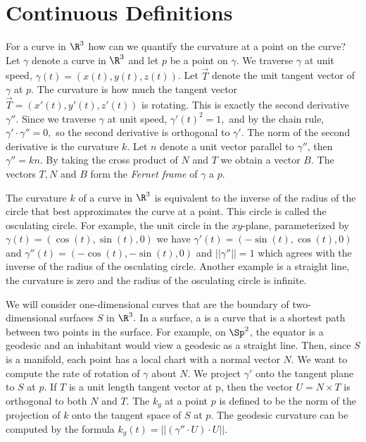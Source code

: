 \section{Continuous Definitions}



For a curve in $\R^3$ how can we quantify the curvature at a point on the curve?
Let $\gamma$ denote a curve in $\R^3$ and let $p$ be a point on $\gamma$.
We traverse $\gamma$ at unit speed, $\gamma(t)=(x(t),y(t),z(t))$.  
Let $\vec{T}$ denote the unit tangent vector of $\gamma$ at $p$. 
The curvature is how much the tangent vector $\vec{T}=(x'(t),y'(t),z'(t))$ is rotating. 
This is exactly the second derivative $\gamma''$. Since we traverse $\gamma$
at unit speed, $\gamma'(t)^2=1,$ and by the chain rule, $\gamma'\cdot \gamma''=0,$
so  the second derivative is orthogonal to $\gamma'$. The norm of the second
derivative is the curvature $k$.
Let $n$ denote a unit vector parallel to $\gamma''$, then $\gamma''=k n$.
By taking the cross product of $N$ and $T$ we obtain a vector $B$.
The vectors $T,N$ and $B$ form the \emph{Fernet frame} of $\gamma$ a $p.$


The curvature $k$ of a curve in $\R^3$ is equivalent to the inverse of the radius
of the circle that best approximates the curve at a point. This circle is called
the osculating circle. 
For example, the unit circle in the $xy$-plane, parameterized by $\gamma(t)=(\cos(t),\sin(t),0)$
we have $\gamma'(t)=(-\sin(t),\cos(t),0)$ and $\gamma''(t)=(-\cos(t),-\sin(t),0)$ and $||\gamma''||=1$
which agrees with the inverse of the radius of the osculating circle.
Another example is a straight line,
the curvature is zero and the radius of the osculating circle is infinite.

We will consider one-dimensional curves that are the boundary of two-dimensional
surfaces $S$ in $\R^3.$ In a surface, a  is a curve that is a shortest path
between two points in the surface. For example, on $\Sp^2$, the equator is a geodesic
and an inhabitant would view a geodesic as a straight line. 
Then, since $S$ is a manifold, each point has a local chart with a normal vector $N$.
We want to compute the rate of rotation of $\gamma$ about $N$.
We project $\gamma'$ onto the tangent plane to $S$ at $p$.
If $T$ is a unit length tangent vector at p, then the vector $U=N\times T$
is orthogonal to both $N$ and $T$.
The  $k_g$ at a point $p$ is defined to be the norm of the projection
of $k$ onto the tangent space of $S$ at $p$. The geodesic curvature can be computed
by the formula $k_g(t)=||(\gamma''\cdot U)\cdot U||.$


